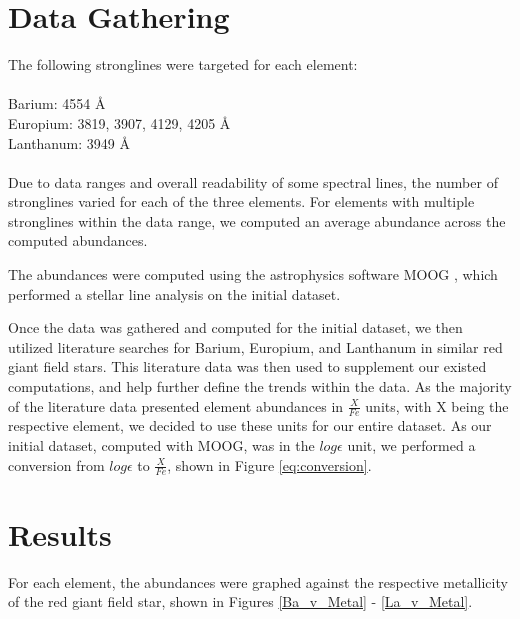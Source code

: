 \section{Data Gathering}
The following stronglines were targeted for each element: \\
\\
Barium: 4554 \AA \\
Europium: 3819, 3907, 4129, 4205 \AA \\
Lanthanum: 3949 \AA \\
\\
Due to data ranges and overall readability of some spectral lines, the number of stronglines varied for each of the three elements. For elements with multiple stronglines within the data range, we computed an average abundance across the computed abundances.

The abundances were computed using the astrophysics software MOOG \cite{moog}, which performed a stellar line analysis on the initial dataset.

Once the data was gathered and computed for the initial dataset, we then utilized literature searches for Barium, Europium, and Lanthanum in similar red giant field stars. This literature data was then used to supplement our existed computations, and help further define the trends within the data. As the majority of the literature data presented element abundances in $\frac{X}{Fe}$ units, with X being the respective element, we decided to use these units for our entire dataset. As our initial dataset, computed with MOOG, was in the $log\epsilon$ unit, we performed a conversion from $log\epsilon$ to $\frac{X}{Fe}$, shown in Figure \ref{eq:conversion}.

\section{Results}

For each element, the abundances were graphed against the respective metallicity of the red giant field star, shown in Figures \ref{Ba_v_Metal} - \ref{La_v_Metal}.

